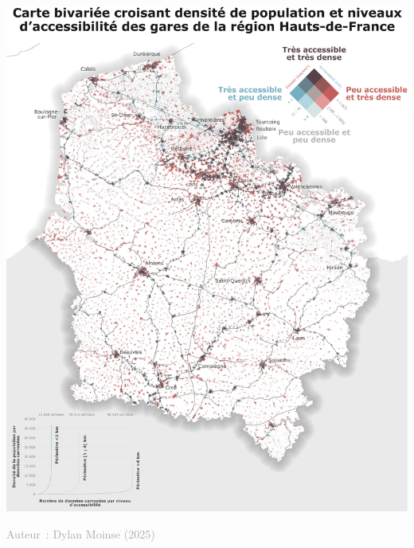 \documentclass[../main.tex]{subfiles}
\begin{document}
\begin{multicols}{2}
\begin{center}
    \includegraphics[width=\columnwidth]{figures/policy-brief-carte-densite-accessibilite-compresse.pdf}
    \label{densite-accessibilite}
    \vspace{-0.4cm}
    \begin{flushright}
            \scriptsize{\textcolor{darkgray}{Auteur~: Dylan Moinse (2025)}}
    \end{flushright}
\end{center}

    \end{multicols}

    
\end{document}
